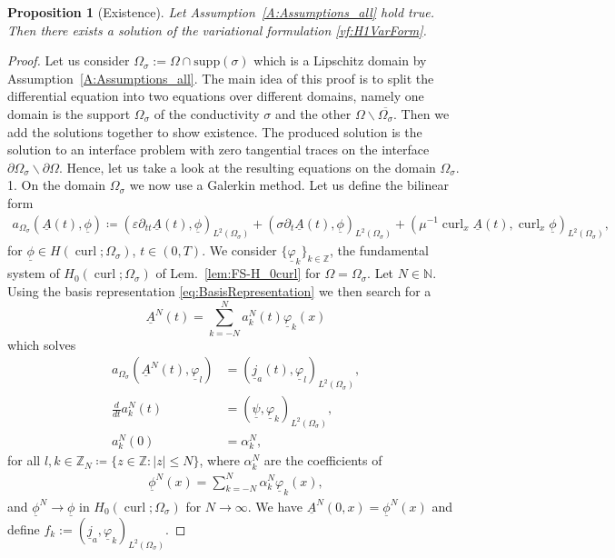 \documentclass[a4paper,11pt]{article}
\newtheorem{prop}{Proposition}
\newcommand{\N}{\mathbb N}
\newcommand{\Z}{\mathbb Z}
\newcommand{\omsig}{\Omega_{\sigma}}
\newcommand{\cu}{\operatorname{curl}}
\renewcommand{\vec}[1]{\underline{#1}}
\begin{document}
\begin{prop}[Existence]\label{prop:Existence_H1_drhs}
	Let Assumption~\ref{A:Assumptions_all} hold true. Then there exists a solution of the variational formulation \eqref{vf:H1VarForm}.
\end{prop}
\begin{proof}
	Let us consider $\omsig := \Omega\cap \mathrm{supp}(\sigma)$ which is a Lipschitz domain by Assumption~\ref{A:Assumptions_all}. The main idea of this proof is to split the differential equation into two equations over different domains, namely one domain is the support $\omsig$ of the conductivity $\sigma$ and the other $\Omega\backslash\overline{\omsig}$. Then we add the solutions together to show existence. The produced solution is the solution to an interface problem with zero tangential traces on the interface $\partial \omsig \backslash \partial \Omega$.  Hence, let us take a look at the resulting equations on the domain $\omsig$.\\
	1. On the domain $\omsig$ we now use a Galerkin method. 	Let us define the bilinear  {form}
	\begin{align}
		\label{def:BilinearForm2}	
		a_{\omsig}(\vec A(t) ,\vec \phi)\coloneqq (\varepsilon\partial_{tt}\vec A(t) ,\vec\phi)_{L^2(\omsig)} +(\sigma\partial_t \vec A(t) ,\vec \phi)_{L^2(\omsig)} +(\mu^{-1}\cu_x  \vec A(t) ,\cu_x \vec\phi)_{L^2(\omsig)},
	\end{align}
	for $\vec \phi\in H(\cu;\omsig)$, $t\in(0,T)$.  We consider $\{\vec\varphi_k\}_{ {k \in \Z}}$, the fundamental system of $H_0(\cu;\omsig)$ of Lem.~\ref{lem:FS-H_0curl} for $\Omega = \Omega_\sigma$. Let $N\in\N$. Using the basis representation \eqref{eq:BasisRepresentation}  we then search for a
	\begin{equation}
		\label{def:AN}
		\vec A^N(t)=\sum\limits_{k=-N}^N  { {a_k^N}}(t)\vec \varphi_k(x)
	\end{equation}
	which  solves
	\begin{align}
		\nonumber
		a_{\omsig}(\vec A^N(t) ,\vec \varphi_l)	&=(\vec j_a {(t)},\vec \varphi_l)_{L^2(\omsig)},\\
		\label{eqn:ckN_drhs}
		\frac{d}{dt}  {a_k^N}(t)&=(\vec \psi,\vec \varphi_k)_{L^2(\omsig)},\\
		\nonumber
		 {a_k^N}(0) &=\alpha_k^N,
	\end{align}
	for all $l,k \in \Z_N \coloneqq \{ z\in \Z: |z| \leq N\}$,	where $\alpha_k^N$ are the coefficients of
	\begin{align*}
		\vec \phi^N(x) = \sum\limits_{k=-N}^N \alpha_k^N\vec \varphi_k(x),
	\end{align*}
	and $\vec \phi^N\to \vec  \phi$ in $H_0(\cu;\omsig)$ for $N\to \infty$. We have $\vec A^N(0,x) = \vec \phi^N(x)$ and define $f_k:= (\vec j_a,\vec \varphi_k)_{L^2(\omsig)} $. 
	

\end{proof}
\end{document}
